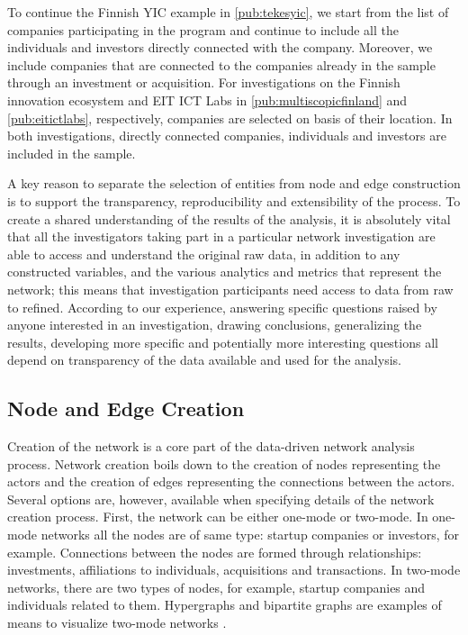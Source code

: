 To continue the Finnish YIC example in \ref{pub:tekesyic}, we start from the list of companies participating in the program and continue to include all the individuals and investors directly connected with the company. Moreover, we include companies that are connected to the companies already in the sample through an investment or acquisition. For investigations on the Finnish innovation ecosystem and EIT ICT Labs in \ref{pub:multiscopicfinland} and \ref{pub:eitictlabs}, respectively, companies are selected on basis of their location. In both investigations, directly connected companies, individuals and investors are included in the sample.

A key reason to separate the selection of entities from node and edge construction is to support the transparency, reproducibility and extensibility of the process. To create a shared understanding of the results of the analysis, it is absolutely vital that all the investigators taking part in a particular network investigation are able to access and understand the original raw data, in addition to any constructed variables, and the various analytics and metrics that represent the network; this means that investigation participants need access to data from raw to refined. According to our experience, answering specific questions raised by anyone interested in an investigation, drawing conclusions, generalizing the results, developing more specific and potentially more interesting questions all depend on transparency of the data available and used for the analysis.

\subsection{Node and Edge Creation}

Creation of the network is a core part of the data-driven network analysis process. Network creation boils down to the creation of nodes representing the actors and the creation of edges representing the connections between the actors. Several options are, however, available when specifying details of the network creation process. First, the network can be either one-mode or two-mode. In one-mode networks all the nodes are of same type: startup companies or investors, for example. Connections between the nodes are formed through relationships: investments, affiliations to individuals, acquisitions and transactions. In two-mode networks, there are two types of nodes, for example, startup companies and individuals related to them. Hypergraphs and bipartite graphs are examples of means to visualize two-mode networks \citep{Jesus2009,Freeman2009MethodsVisualization}.

